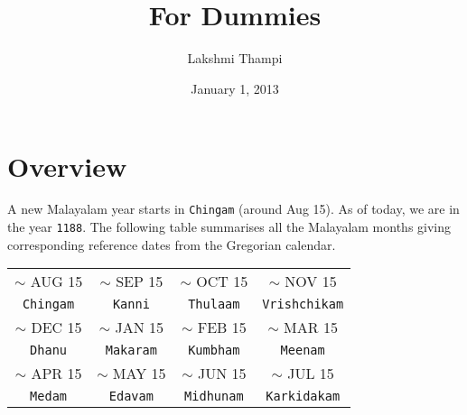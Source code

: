 \documentclass[10pt,twoside]{article}
\title{\textbf{\doctitle}\\
For Dummies}
\author{Lakshmi Thampi}
\date{January 1, 2013}
\begin{document}
\thispagestyle{empty}

\maketitle

\section{Overview}
A new Malayalam year starts in \verb|Chingam| (around Aug 15). As of today, we are in the year \verb|1188|. The following table summarises all the Malayalam months giving corresponding reference dates from the Gregorian calendar.

\begin{table}[!h]
\centering
\begin{tabular}{| c | c | c | c |}
\hline
$\sim$ AUG 15 & $\sim$ SEP 15 & $\sim$ OCT 15 & $\sim$ NOV 15 \\ 
\verb|Chingam| & \verb|Kanni| & \verb|Thulaam| & \verb|Vrishchikam| \\ \hline
$\sim$ DEC 15 & $\sim$ JAN 15 & $\sim$ FEB 15 & $\sim$ MAR 15 \\ 
\verb|Dhanu| & \verb|Makaram| & \verb|Kumbham| & \verb|Meenam| \\ \hline
$\sim$ APR 15 & $\sim$ MAY 15 & $\sim$ JUN 15 & $\sim$ JUL 15 \\ 
\verb|Medam| & \verb|Edavam| & \verb|Midhunam| & \verb|Karkidakam| \\ \hline
\end{tabular}
\label{table:overview}
\end{table}
\end{document}
